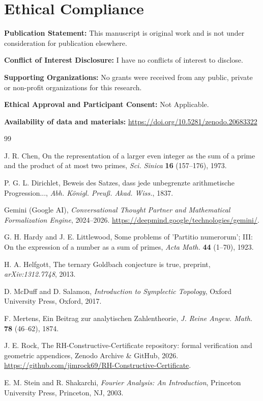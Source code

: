 \documentclass[sn-mathphys-num, pdflatex]{sn-jnl}
\begin{document}
\section*{Ethical Compliance}
\noindent \textbf{Publication Statement:} This manuscript is original work and is not under consideration for publication elsewhere. 

\noindent \textbf{Conflict of Interest Disclosure:} I have no conflicts of interest to disclose.   

\noindent \textbf{Supporting Organizations:} No grants were received from any public, private or non-profit organizations for this research. 

\noindent \textbf{Ethical Approval and Participant Consent:} Not Applicable. 

\noindent \textbf{Availability of data and materials:} \url{https://doi.org/10.5281/zenodo.20683322}

\begin{thebibliography}{99}
{
J. R. Chen, On the representation of a larger even integer as the sum of a prime and the product of at most two primes, \textit{Sci. Sinica} \textbf{16} (157--176), 1973.

P. G. L. Dirichlet, Beweis des Satzes, dass jede unbegrenzte arithmetische Progression..., \textit{Abh. Königl. Preuß. Akad. Wiss.}, 1837.

Gemini (Google AI), \textit{Conversational Thought Partner and Mathematical Formalization Engine}, 2024--2026. \url{https://deepmind.google/technologies/gemini/}.

G. H. Hardy and J. E. Littlewood, Some problems of 'Partitio numerorum'; III: On the expression of a number as a sum of primes, \textit{Acta Math.} \textbf{44} (1--70), 1923.

H. A. Helfgott, The ternary Goldbach conjecture is true, preprint, \textit{arXiv:1312.7748}, 2013.

D. McDuff and D. Salamon, \textit{Introduction to Symplectic Topology}, Oxford University Press, Oxford, 2017.

F. Mertens, Ein Beitrag zur analytischen Zahlentheorie, \textit{J. Reine Angew. Math.} \textbf{78} (46--62), 1874.

J. E. Rock, The RH-Constructive-Certificate repository: formal verification and geometric appendices, Zenodo Archive \& GitHub, 2026. \url{https://github.com/jimrock69/RH-Constructive-Certificate}.

E. M. Stein and R. Shakarchi, \textit{Fourier Analysis: An Introduction}, Princeton University Press, Princeton, NJ, 2003.
}
\end{thebibliography}
\end{document}
